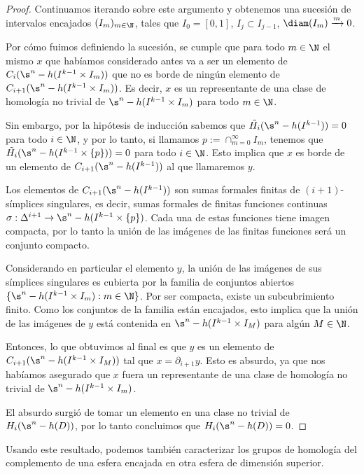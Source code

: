 \begin{proof}
    Continuamos iterando sobre este argumento y obtenemos una sucesión de intervalos encajados $(I_m)_{m\in\N}$, tales que $I_0=[0,1]$, $I_j\subset I_{j-1}$, $\diam(I_m)\xrightarrow{m}0$.

    Por cómo fuimos definiendo la sucesión, se cumple que para todo $m\in\N$ el mismo $x$ que habíamos considerado antes va a ser un elemento de $C_i(\s^n - h(I^{k-1}\times I_m))$ que no es borde de ningún elemento de $C_{i+1}(\s^n - h(I^{k-1}\times I_m))$. Es decir, $x$ es un representante de una clase de homología no trivial de $\s^n - h(I^{k-1}\times I_m)$ para todo $m\in\N$.

    Sin embargo, por la hipótesis de inducción sabemos que $\tilde{H_i}(\s^n - h(I^{k-1}))=0$ para todo $i\in\N$, y por lo tanto, si llamamos $p:=\cap_{m=0}^\infty I_m$, tenemos que $\tilde{H_i}(\s^n - h(I^{k-1}\times\{p\}))=0$ para todo $i\in\N$. Esto implica que $x$ es borde de un elemento de $C_{i+1}(\s^n - h(I^{k-1}))$ al que llamaremos $y$.

    Los elementos de $C_{i+1}(\s^n - h(I^{k-1}))$ son sumas formales finitas de $(i+1)$-símplices singulares, es decir, sumas formales de finitas funciones continuas $\sigma:\Delta^{i+1}\to\s^n - h(I^{k-1}\times\{p\})$. Cada una de estas funciones tiene imagen compacta, por lo tanto la unión de las imágenes de las finitas funciones será un conjunto compacto.

    Considerando en particular el elemento $y$, la unión de las imágenes de sus símplices singulares es cubierta por la familia de conjuntos abiertos $\{\s^n - h(I^{k-1}\times I_m) : m\in\N\}$. Por ser compacta, existe un subcubrimiento finito. Como los conjuntos de la familia están encajados, esto implica que la unión de las imágenes de $y$ está contenida en $\s^n - h(I^{k-1}\times I_M)$ para algún $M\in\N$.
    
    Entonces, lo que obtuvimos al final es que $y$ es un elemento de $C_{i+1}(\s^n - h(I^{k-1}\times I_M))$ tal que $x=\partial_{i+1} y$. Esto es absurdo, ya que nos habíamos asegurado que $x$ fuera un representante de una clase de homología no trivial de $\s^n - h(I^{k-1}\times I_m)$.

    El absurdo surgió de tomar un elemento en una clase no trivial de $H_i(\s^n-h(D))$, por lo tanto concluimos que $H_i(\s^n-h(D))=0$.
\end{proof}

Usando este resultado, podemos también caracterizar los grupos de homología del complemento de una esfera encajada en otra esfera de dimensión superior.

